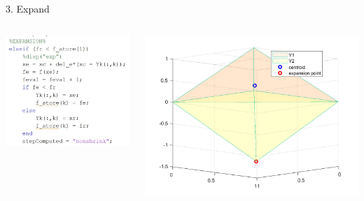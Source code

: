 \documentclass{beamer}
\begin{document}
\begin{frame}{3. Expand}
	\begin{columns}
	\begin{column}{0.39\linewidth}
		\centering
		\includegraphics[width=0.95\linewidth]{Expand}
	\end{column}
	\begin{column}{0.59\linewidth}
		\centering
		\includegraphics[width=0.95\linewidth]{ExpandFig}
	\end{column}
	\end{columns}
\end{frame}
\end{document}
